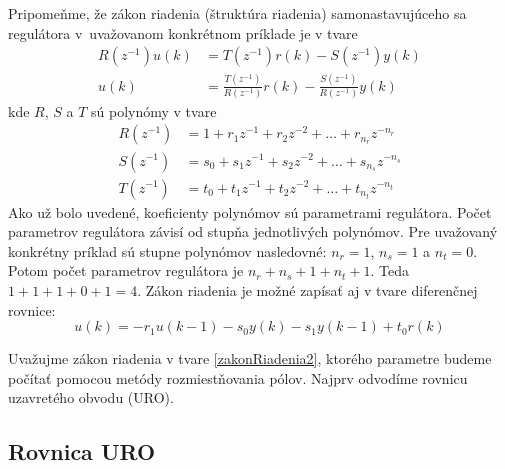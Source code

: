 \documentclass[a4paper, 10pt, ]{article}
\begin{document}
Pripomeňme, že zákon riadenia (štruktúra riadenia) samonastavujúceho sa regulátora v~uvažovanom konkrétnom príklade je v tvare
\begin{subequations} \label{zakonRiadenia2}
	\begin{align}
		R(z^{-1})u(k) & = T(z^{-1})r(k) - S(z^{-1})y(k) \\
		u(k) & = \frac{T(z^{-1})}{R(z^{-1})}r(k) - \frac{S(z^{-1})}{R(z^{-1})}y(k)
	\end{align}
\end{subequations}
kde $R$, $S$ a $T$ sú polynómy v tvare
\begin{subequations}
	\begin{align}
		R(z^{-1}) & = 1 + r_1z^{-1} + r_2z^{-2} + \ldots +  r_{n_r}z^{-n_r}\\
		S(z^{-1}) & = s_0 + s_1z^{-1} + s_2z^{-2} + \ldots +  s_{n_s}z^{-n_s} \\
		T(z^{-1}) & = t_0 + t_1z^{-1} + t_2z^{-2} + \ldots +  t_{n_t}z^{-n_t}
	\end{align}
\end{subequations}
Ako už bolo uvedené, koeficienty polynómov sú parametrami regulátora. Počet parametrov regulátora závisí od stupňa jednotlivých polynómov. Pre uvažovaný konkrétny príklad sú stupne polynómov nasledovné: $n_r = 1$, $n_s = 1$ a $n_t = 0$. Potom počet parametrov regulátora je $n_r + n_s + 1 + n_t + 1$. Teda $1 + 1 + 1 + 0 + 1 = 4$. Zákon riadenia je možné zapísať aj v tvare diferenčnej rovnice:
\begin{equation}
	u(k) =  - r_1 u(k-1) - s_0 y(k) - s_1 y(k-1) + t_0 r(k)
\end{equation}


\bigskip

Uvažujme zákon riadenia v tvare \eqref{zakonRiadenia2}, ktorého parametre budeme počítať pomocou metódy rozmiestňovania pólov. Najprv odvodíme rovnicu uzavretého obvodu (URO).



















\subsection{Rovnica URO}
\end{document}
